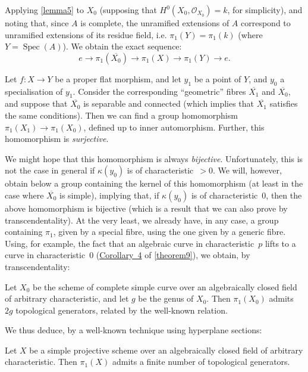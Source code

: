\documentclass{article}
\theoremstyle{plain}
\newenvironment{corollary}[1]
  {\renewcommand\theinnercustomcorollary{#1}\innercustomcorollary}
  {\endinnercustomcorollary}
\theoremstyle{definition}
\newcommand{\sh}{\mathscr}
\newcommand{\kres}{\kappa}
\DeclareMathOperator{\Spec}{Spec}
\newcommand{\oldpage}[1]{\marginpar{\footnotesize$\Big\vert$ \textit{p.~#1}}}
\begin{document}
Applying \cref{lemma5} to $X_0$ (supposing that $H^0(X_0,\sh{O}_{X_0})=k$, for simplicity), and noting that, since $A$ is complete, the unramified extensions of $A$ correspond to unramified extensions of its residue field, i.e. $\pi_1(Y)=\pi_1(k)$ (where $Y=\Spec(A)$).
We obtain the exact sequence:
\[
  e \to \pi_1(\overline{X_0}) \to \pi_1(X) \to \pi_1(Y) \to e.
\]

\begin{corollary}{2}
\label{theorem12corollary2}
  Let $f\colon X\to Y$ be a proper flat morphism, and let $y_1$ be a point of $Y$, and $y_0$ a specialisation of $y_1$.
  Consider the corresponding ``geometric'' fibres $\overline{X_1}$ and $\overline{X_0}$, and suppose that $\overline{X_0}$ is separable and connected (which implies that $\overline{X_1}$ satisfies the same conditions).
  Then we can find a group homomorphism $\pi_1(X_1)\to\pi_1(X_0)$, defined up to inner automorphism.
  Further, this homomorphism is \emph{surjective}.
\end{corollary}

\oldpage{182-25}
We might hope that this homomorphism is always \emph{bijective}.
Unfortunately, this is not the case in general if $\kres(y_0)$ is of characteristic~$>0$.
We will, however, obtain below a group containing the kernel of this homomorphism (at least in the case where $\overline{X_0}$ is simple), implying that, if $\kres(y_0)$ is of characteristic~$0$, then the above homomorphism is bijective (which is a result that we can also prove by transcendentality).
At the very least, we already have, in any case, a group containing $\pi_1$, given by a special fibre, using the one given by a generic fibre.
Using, for example, the fact that an algebraic curve in characteristic~$p$ lifts to a curve in characteristic~$0$ (\hyperref[theorem9corollary4]{Corollary~4} of \cref{theorem9}), we obtain, by transcendentality:

\begin{corollary}{3}
\label{theorem12corollary3}
  Let $X_0$ be the scheme of complete simple curve over an algebraically closed field of arbitrary characteristic, and let $g$ be the genus of $X_0$.
  Then $\pi_1(X_0)$ admits $2g$ topological generators, related by the well-known relation.
\end{corollary}

We thus deduce, by a well-known technique using hyperplane sections:

\begin{corollary}{4}
\label{theorem12corollary4}
  Let $X$ be a simple projective scheme over an algebraically closed field of arbitrary characteristic.
  Then $\pi_1(X)$ admits a finite number of topological generators.
\end{corollary}
\end{document}
